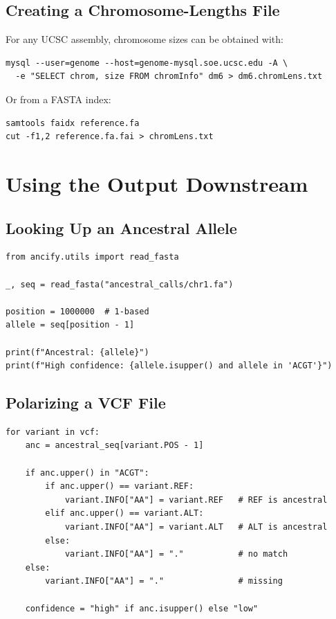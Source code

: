 \documentclass[11pt,a4paper]{article}
\begin{document}
\subsection{Creating a Chromosome-Lengths File}

For any UCSC assembly, chromosome sizes can be obtained with:
\begin{lstlisting}[style=bashstyle]
mysql --user=genome --host=genome-mysql.soe.ucsc.edu -A \
  -e "SELECT chrom, size FROM chromInfo" dm6 > dm6.chromLens.txt
\end{lstlisting}

Or from a FASTA index:
\begin{lstlisting}[style=bashstyle]
samtools faidx reference.fa
cut -f1,2 reference.fa.fai > chromLens.txt
\end{lstlisting}


\section{Using the Output Downstream}
\label{sec:downstream}

\subsection{Looking Up an Ancestral Allele}

\begin{lstlisting}[caption={Python: look up ancestral allele at a genomic position.}]
from ancify.utils import read_fasta

_, seq = read_fasta("ancestral_calls/chr1.fa")

position = 1000000  # 1-based
allele = seq[position - 1]

print(f"Ancestral: {allele}")
print(f"High confidence: {allele.isupper() and allele in 'ACGT'}")
\end{lstlisting}

\subsection{Polarizing a VCF File}

\begin{lstlisting}[caption={Pseudocode for VCF polarization.}]
for variant in vcf:
    anc = ancestral_seq[variant.POS - 1]

    if anc.upper() in "ACGT":
        if anc.upper() == variant.REF:
            variant.INFO["AA"] = variant.REF   # REF is ancestral
        elif anc.upper() == variant.ALT:
            variant.INFO["AA"] = variant.ALT   # ALT is ancestral
        else:
            variant.INFO["AA"] = "."           # no match
    else:
        variant.INFO["AA"] = "."               # missing

    confidence = "high" if anc.isupper() else "low"
\end{lstlisting}
\end{document}

